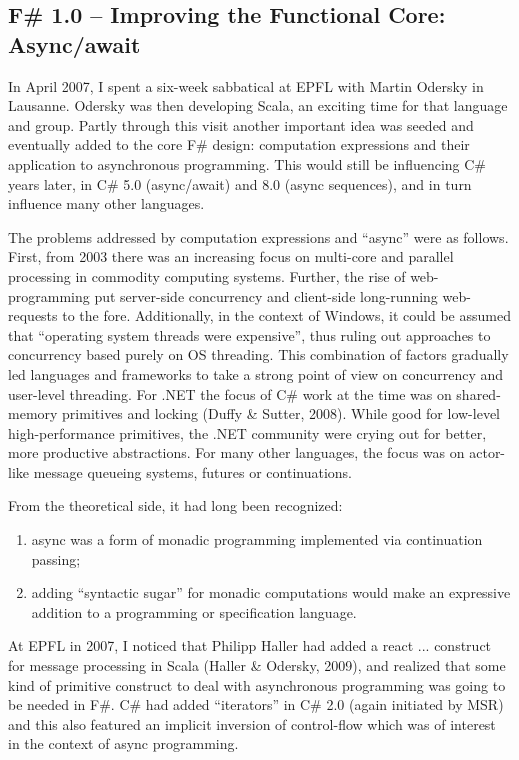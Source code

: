 \documentclass[acmsmall]{acmart}\settopmatter{}
\begin{document}
\subsection*{F\# 1.0 – Improving the Functional Core: Async/await}

In April 2007, I spent a six-week sabbatical at EPFL with Martin Odersky in Lausanne.  Odersky was then developing Scala, an exciting time for that language and group. Partly through this visit another important idea was seeded and eventually added to the core F\# design: computation expressions and their application to asynchronous programming.  This would still be influencing C\# years later, in C\# 5.0 (async/await) and 8.0 (async sequences), and in turn influence many other languages. 

The problems addressed by computation expressions and “async” were as follows.  First, from 2003 there was an increasing focus on multi-core and parallel processing in commodity computing systems. Further, the rise of web-programming put server-side concurrency and client-side long-running web-requests to the fore. Additionally, in the context of Windows, it could be assumed that “operating system threads were expensive”, thus ruling out approaches to concurrency based purely on OS threading.  This combination of factors gradually led languages and frameworks to take a strong point of view on concurrency and user-level threading.  For .NET the focus of C\# work at the time was on shared-memory primitives and locking (Duffy \& Sutter, 2008). While good for low-level high-performance primitives, the .NET community were crying out for better, more productive abstractions.  For many other languages, the focus was on actor-like message queueing systems, futures or continuations.  

From the theoretical side, it had long been recognized:

\begin{enumerate}
\item async was a form of monadic programming implemented via continuation passing;
\item adding “syntactic sugar” for monadic computations would make an expressive addition to a programming or specification language.
\end{enumerate}


At EPFL in 2007, I noticed that Philipp Haller had added a react { ... } construct for message processing in Scala (Haller \& Odersky, 2009), and realized that some kind of primitive construct to deal with asynchronous programming was going to be needed in F\#.  C\# had added “iterators” in C\# 2.0 (again initiated by MSR) and this also featured an implicit inversion of control-flow which was of interest in the context of async programming.
\end{document}
